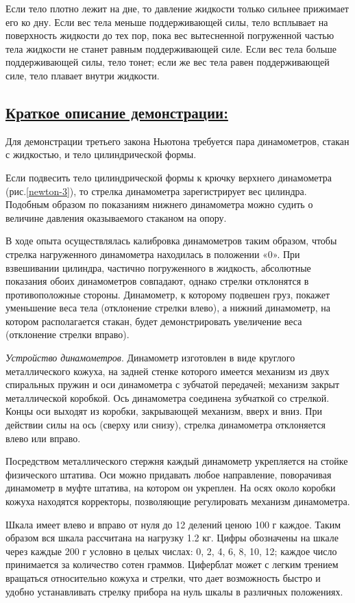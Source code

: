 \documentclass[14pt,a4paper,oneside]{extarticle}	%
\begin{document}
Если тело плотно лежит на дне, то давление жидкости только сильнее прижимает его ко дну. 
Если вес тела меньше поддерживающей силы, тело всплывает на поверхность жидкости до тех пор, пока вес вытесненной погруженной частью тела жидкости не станет равным поддерживающей силе. 
Если вес тела больше поддерживающей силы, тело тонет; если же вес тела равен поддерживающей силе, тело плавает внутри жидкости.

\newpage
\subsection*{\underline{Краткое описание демонстрации:}}

Для демонстрации третьего закона Ньютона требуется пара динамометров, стакан с жидкостью, и тело цилиндрической формы.

Если подвесить тело цилиндрической формы к крючку верхнего динамометра (рис.\ref{newton-3}), то стрелка динамометра зарегистрирует вес цилиндра.
Подобным образом по показаниям нижнего динамометра можно судить о величине давления оказываемого стаканом на опору.

В ходе опыта осуществлялась калибровка динамометров таким образом, чтобы стрелка нагруженного динамометра находилась в положении «0».
При взвешивании цилиндра, частично погруженного в жидкость, абсолютные показания обоих динамометров совпадают, однако стрелки отклонятся в противоположные стороны.
Динамометр, к которому подвешен груз, покажет уменьшение веса тела (отклонение стрелки влево), а нижний динамометр, на котором располагается стакан, будет демонстрировать увеличение веса (отклонение стрелки вправо).

\textit{Устройство динамометров}. Динамометр изготовлен в виде круглого металлического кожуха, на задней стенке которого имеется механизм из двух спиральных пружин и оси динамометра с зубчатой передачей; механизм закрыт металлической коробкой.
Ось динамометра соединена зубчаткой со стрелкой. 
Концы оси выходят из коробки, закрывающей механизм, вверх и вниз.
При действии силы на ось (сверху или снизу), стрелка динамометра отклоняется влево или вправо.

Посредством металлического стержня каждый динамометр укрепляется на стойке физического штатива.
Оси можно придавать любое направление, поворачивая динамометр в муфте штатива, на котором он укреплен.
На осях около коробки кожуха находятся корректоры, позволяющие регулировать механизм динамометра.

Шкала имеет влево и вправо от нуля до 12 делений ценою 100 г каждое.
Таким образом вся шкала рассчитана на нагрузку 1.2 кг.
Цифры обозначены на шкале через каждые 200 г условно в целых числах: 0, 2, 4, 6, 8, 10, 12; каждое число принимается за количество сотен граммов.
Циферблат может с легким трением вращаться относительно кожуха и стрелки, что дает возможность быстро и удобно устанавливать стрелку прибора на нуль шкалы в различных положениях.
\end{document}
